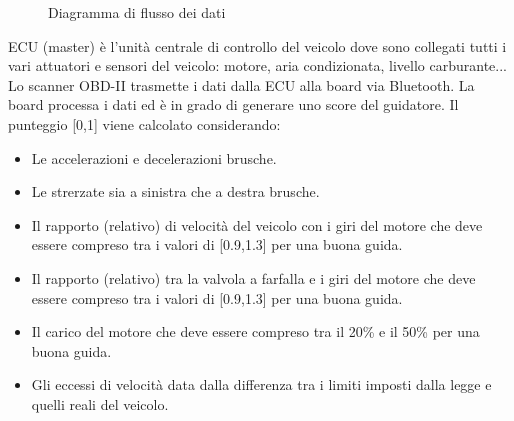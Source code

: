\documentclass[12pt, a4paper, italian]{report}
\numberwithin{figure}{chapter}
\numberwithin{table}{chapter}
\begin{document}
\begin{figure}[h!]
\centering
{}
\caption{Diagramma di flusso dei dati}
\label{diagrammaFlussoProfilazione}
\end{figure}

ECU (master) è l'unità centrale di controllo del veicolo dove sono collegati tutti i vari attuatori e sensori del veicolo: motore, aria condizionata, livello carburante... Lo scanner OBD-II trasmette i dati dalla ECU alla board via Bluetooth. La board processa i dati ed è in grado di generare uno score del guidatore. Il punteggio [0,1] viene calcolato considerando:

\begin{itemize}
    \item Le accelerazioni e decelerazioni brusche. \cite{fazeen2012safe}
    \item Le strerzate sia a sinistra che a destra brusche. \cite{fazeen2012safe}
    \item Il rapporto (relativo) di velocità del veicolo con i giri del motore che deve essere compreso tra i valori di [0.9,1.3] per una buona guida. \cite{chen2015driving}
    \item Il rapporto (relativo) tra la valvola a farfalla e i giri del motore che deve essere compreso tra i valori di [0.9,1.3] per una buona guida. \cite{chen2015driving}
    \item Il carico del motore che deve essere compreso tra il 20\% e il 50\% per una buona guida. \cite{chen2015driving}
    \item Gli eccessi di velocità data dalla differenza tra i limiti imposti dalla legge e quelli reali del veicolo.
\end{itemize}
\end{document}
